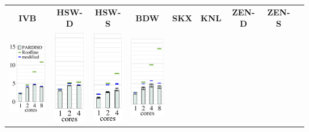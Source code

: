 
 \begin{tabular}{ccccccccl}
 \multicolumn{1}{c}{\scriptsize \bfseries IVB} & \multicolumn{1}{c}{\scriptsize \bfseries
HSW-D} & \multicolumn{1}{c}{\scriptsize \bfseries HSW-S} & \multicolumn{1}{c}{\scriptsize
\bfseries BDW} & \multicolumn{1}{c}{\scriptsize \bfseries SKX} &
\multicolumn{1}{c}{\scriptsize \bfseries KNL} & \multicolumn{1}{c}{\scriptsize \bfseries
    ZEN-D} & \multicolumn{1}{c}{\scriptsize \bfseries ZEN-S} & \\

  \includegraphics[height=4.0cm,clip=true]{images/perf/p-80/p-emmy-n-40-b-4}%
  & 
  \includegraphics[height=4.0cm,clip=true]{images/perf/p-80/p-woody-hsw-n-40-b-4}%
  & 
  \includegraphics[height=4.0cm,clip=true]{images/perf/p-80/p-hasep1-n-40-b-4}%
  & 
  \includegraphics[height=4.0cm,clip=true]{images/perf/p-80/p-meggie-n-40-b-4}%

\end{tabular}
